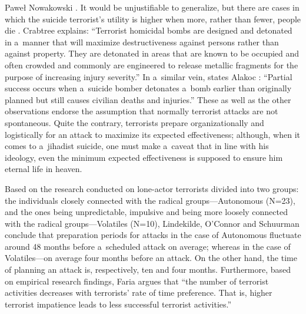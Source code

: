 \begin{artengenv}{Paweł Nowakowski}
{%
\parencite[see][pp.346–366]{Mroszczyk2019To}.%
} It would be unjustifiable to generalize, but there are cases in which the suicide terrorist's utility is higher when more, rather than fewer, people die 
\parencites[see][p.25]{Asthappan2010Effectiveness}[][]{BBC2019German}. %
 Crabtree 
\parencite*[][p.577]{Crabtree2006Terrorist} %
 explains: ``Terrorist homicidal bombs are designed and detonated in a~manner that will maximize destructiveness against persons rather than against property. They are detonated in areas that are known to be occupied and often crowded and commonly are engineered to release metallic fragments for the purpose of increasing injury severity.'' In a~similar vein, states Alakoc 
\parencite*[][p.6]{Alakoc2017When}: %
 ``Partial success occurs when a~suicide bomber detonates a~bomb earlier than originally planned but still causes civilian deaths and injuries.'' These as well as the other observations endorse the assumption that normally terrorist attacks are not spontaneous. Quite the contrary, terrorists prepare organizationally and logistically for an attack to maximize its expected effectiveness; although, when it comes to a~jihadist suicide, one must make a~caveat that in line with his ideology, even the minimum expected effectiveness is supposed to ensure him eternal life in heaven.



Based on the research conducted on lone-actor terrorists divided into two groups: the individuals closely connected with the radical groups---Autonomous (N=23), and the ones being unpredictable, impulsive and being more loosely connected with the radical groups---Volatiles (N=10), Lindekilde, O'Connor and Schuurman 
\parencite*[][p.126]{Lindekilde2019Radicalization} %
 conclude that preparation periods for attacks in the case of Autonomous fluctuate around 48 months before a~scheduled attack on average; whereas in the case of Volatiles---on average four months before an attack. On the other hand, the time of planning an attack is, respectively, ten and four months. Furthermore, based on empirical research findings, Faria 
\parencite*[][]{Faria2003Terror} %
 argues that ``the number of terrorist activities decreases with terrorists' rate of time preference. That is, higher terrorist impatience leads to less successful terrorist activities.''




\end{artengenv}
